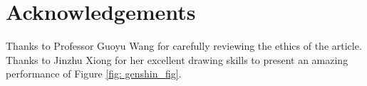 \documentclass{article}
\begin{document}
% 
% 
% 
% 
% 
% 
% 





\section*{Acknowledgements}
Thanks to Professor Guoyu Wang for carefully reviewing the ethics of the article. 
Thanks to Jinzhu Xiong for her excellent drawing skills to present an amazing performance of Figure \ref{fig: genshin_fig}.






\end{document}
